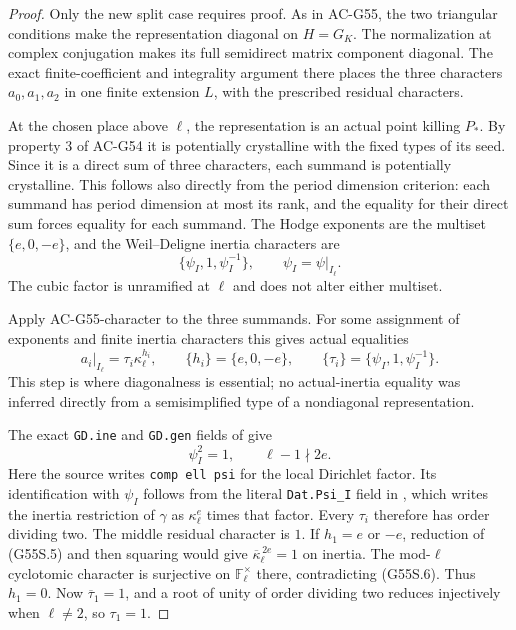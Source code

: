 \begin{proof}
Only the new split case requires proof.
As in AC-G55, the two triangular conditions
make the representation diagonal on $H=G_K$.
The normalization at complex conjugation makes
its full semidirect matrix component diagonal.
The exact finite-coefficient and integrality
argument there places the three characters
$a_0,a_1,a_2$ in one finite extension $L$, with
the prescribed residual characters.

At the chosen place above $\ell$, the
representation is an actual point killing
$P_*$.
By property 3 of AC-G54 it is potentially
crystalline with the fixed types of its seed.
Since it is a direct sum of three characters,
each summand is potentially crystalline.
This follows also directly from the period
dimension criterion: each summand has period
dimension at most its rank, and the equality
for their direct sum forces equality for
each summand.
The Hodge exponents are the multiset
$\{e,0,-e\}$, and the Weil--Deligne inertia
characters are
\[
                   \{\psi_I,1,\psi_I^{-1}\},
                       \qquad \psi_I=\psi|_{I_\ell}.
                                                               \tag{G55S.4}
\]
The cubic factor is unramified at $\ell$ and
does not alter either multiset.

Apply AC-G55-character to the three summands.
For some assignment of exponents and finite
inertia characters this gives actual equalities
\[
 a_i|_{I_\ell}=\tau_i\kappa_\ell^{h_i},\qquad
 \{h_i\}=\{e,0,-e\},\qquad
 \{\tau_i\}=\{\psi_I,1,\psi_I^{-1}\}.
                                                               \tag{G55S.5}
\]
This step is where diagonalness is essential;
no actual-inertia equality was inferred
directly from a semisimplified type of a
nondiagonal representation.

The exact \texttt{GD.ine} and \texttt{GD.gen}
fields of
give
\[
            \psi_I^2=1,\qquad
                         \ell-1\nmid2e .
                                                               \tag{G55S.6}
\]
Here the source writes \texttt{comp ell psi} for
the local Dirichlet factor.  Its identification
with $\psi_I$ follows from the literal
\texttt{Dat.Psi\_I} field in
,
which writes the inertia restriction of $\gamma$
as $\kappa_\ell^e$ times that factor.
Every $\tau_i$ therefore has order dividing two.
The middle residual character is $1$.
If $h_1=e$ or $-e$, reduction of (G55S.5)
and then squaring would give
$\overline\kappa_\ell^{\,2e}=1$ on inertia.
The mod-$\ell$ cyclotomic character is
surjective on $\mathbb F_\ell^\times$ there,
contradicting (G55S.6).
Thus $h_1=0$.
Now $\overline{\tau}_1=1$, and a root of
unity of order dividing two reduces injectively
when $\ell\ne2$, so $\tau_1=1$.


\end{proof}
